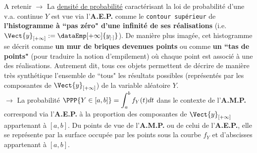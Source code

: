 \documentclass[10pt]{report}
\begin{document}
\begin{exercice}
\begin{enumerate}
\begin{Indication}{A retenir}
$\to$ La \underline{densité de probabilité} caractérisant la loi de probabilité d'une v.a. continue $Y$ est vue via l'\textbf{A.E.P.} comme le \texttt{contour supérieur} de \textbf{l'histogramme à ``pas zéro" d'une infinité de ses réalisations} (i.e. $\Vect{y}_{[+\infty]}:=\dataEmp[+\infty]{y_{[\cdot]}}$). De manière plus imagée, cet histogramme se décrit comme \textbf{un mur de briques devenues points}  ou comme \textbf{un ``tas de points"} (pour traduire la notion d'empilement) où chaque point est associé à une des réalisations. Autrement dit, tous ces objets permettent de décrire de manière très synthétique l'ensemble de ``tous" les résultats possibles (représentés par les composantes de $\Vect{y}_{[+\infty]}$) de la variable aléatoire $Y$.\\ 
\noindent $\to$ La probabilité $\PPP{Y\in [a,b]}=\displaystyle\int_a^b f_{Y}(t)dt$ dans le contexte de l'\textbf{A.M.P.} correspond via l'\textbf{A.E.P.} à la proportion des composantes de $\Vect{y}_{[+\infty]}$ appartenant à $[a,b]$. Du points de vue de l'\textbf{A.M.P.} ou de celui de l'\textbf{A.E.P.}, elle se représente par la surface occupée par les points sous la courbe $f_Y$ et d'abscisses appartenant à $[a,b]$.  
\end{Indication}

\end{enumerate}
\end{exercice}
\end{document}
